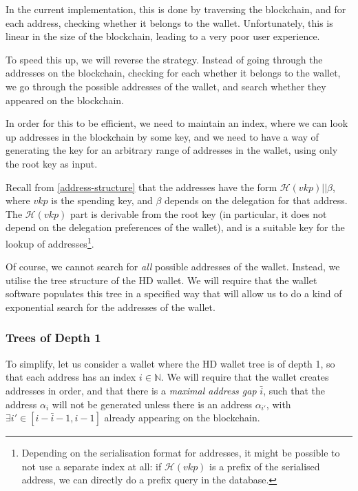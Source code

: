 \documentclass[11pt,a4paper]{article}
\begin{document}
In the current implementation, this is done by traversing the
blockchain, and for each address, checking whether it belongs to the
wallet. Unfortunately, this is linear in the size of the blockchain,
leading to a very poor user experience.

To speed this up, we will reverse the strategy. Instead of going through
the addresses on the blockchain, checking for each whether it belongs to
the wallet, we go through the possible addresses of the wallet, and
search whether they appeared on the blockchain.

In order for this to be efficient, we need to maintain an index, where
we can look up addresses in the blockchain by some key, and we need to
have a way of generating the key for an arbitrary range of addresses in
the wallet, using only the root key as input.

Recall from \ref{address-structure} that the addresses have the form
\(\mathcal{H}({vkp}) || \beta\), where \(vkp\) is the spending key, and
\(\beta\) depends on the delegation for that address. The
\(\mathcal{H}({vkp})\) part is derivable from the root key (in
particular, it does not depend on the delegation preferences of the
wallet), and is a suitable key for the lookup of addresses\footnote{Depending
  on the serialisation format for addresses, it might be possible to not
  use a separate index at all: if \(\mathcal{H}({vkp})\) is a prefix of
  the serialised address, we can directly do a prefix query in the
  database.}.

Of course, we cannot search for \emph{all} possible addresses of the
wallet. Instead, we utilise the tree structure of the HD wallet. We will
require that the wallet software populates this tree in a specified way
that will allow us to do a kind of exponential search for the addresses
of the wallet.

\subsubsection{Trees of Depth 1}\label{trees-of-depth-1}

To simplify, let us consider a wallet where the HD wallet tree is of
depth 1, so that each address has an index \(i \in \mathbb{N}\). We will
require that the wallet creates addresses in order, and that there is a
\emph{maximal address gap} \(\bar{i}\), such that the address
\(\alpha_i\) will not be generated unless there is an address
\(\alpha_{i'}\), with \(\exists i' \in [i-\bar{i}-1, i-1]\) already
appearing on the blockchain.
\end{document}
